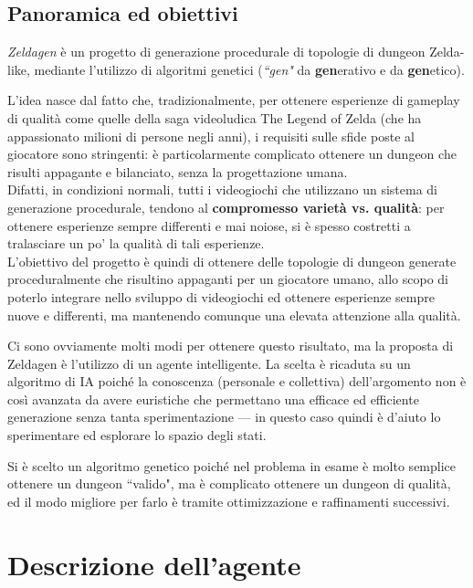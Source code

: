 \documentclass[12pt,titlepage]{article}
\begin{document}
\subsection {Panoramica ed obiettivi}
\textit{Zeldagen} è un progetto di generazione procedurale di topologie di dungeon Zelda-like, mediante l'utilizzo di algoritmi genetici (\textit{``gen"} da \textbf{gen}erativo e da \textbf{gen}etico).

\noindent L'idea nasce dal fatto che, tradizionalmente, per ottenere esperienze di gameplay di qualità come quelle della saga videoludica The Legend of Zelda (che ha appassionato milioni di persone negli anni), i requisiti sulle sfide poste al giocatore sono stringenti: è particolarmente complicato ottenere un dungeon che risulti appagante e bilanciato, senza la progettazione umana.\\

\noindent Difatti, in condizioni normali, tutti i videogiochi che utilizzano un sistema di generazione procedurale, tendono al \textbf{compromesso varietà vs. qualità}: per ottenere esperienze sempre differenti e mai noiose, si è spesso costretti a tralasciare un po' la qualità di tali esperienze.\\

\noindent L'obiettivo del progetto è quindi di ottenere delle topologie di dungeon generate proceduralmente che risultino appaganti per un giocatore umano, allo scopo di poterlo integrare nello sviluppo di videogiochi ed ottenere esperienze sempre nuove e differenti, ma mantenendo comunque una elevata attenzione alla qualità.

Ci sono ovviamente molti modi per ottenere questo risultato, ma la proposta di Zeldagen è l'utilizzo di un agente intelligente. La scelta è ricaduta su un algoritmo di IA poiché la conoscenza (personale e collettiva) dell'argomento non è così avanzata da avere euristiche che permettano una efficace ed efficiente generazione senza tanta sperimentazione --- in questo caso quindi è d'aiuto lo sperimentare ed esplorare lo spazio degli stati.

Si è scelto un algoritmo genetico poiché nel problema in esame è molto semplice ottenere un dungeon ``valido", ma è complicato ottenere un dungeon di qualità, ed il modo migliore per farlo è tramite ottimizzazione e raffinamenti successivi.

\section{Descrizione dell'agente}
\end{document}
